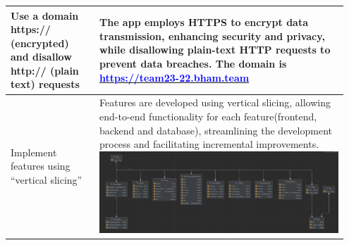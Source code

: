 \documentclass[a4paper]{article}
\begin{document}
{\begin{tabular}{|p{0.25\linewidth}|p{0.70\linewidth}|}
 \hline
 Use a domain https:// (encrypted) and disallow http:// (plain text) requests &  The app employs HTTPS to encrypt data transmission, enhancing security and privacy, while disallowing plain-text HTTP requests to prevent data breaches. The domain is \href{https://team23-22.bham.team}{\textcolor{blue}{https://team23-22.bham.team}}\\
 \hline
 Implement features using “vertical slicing” & Features are developed using vertical slicing, allowing end-to-end functionality for each feature(frontend, backend and database), streamlining the development process and facilitating incremental improvements. \includegraphics[width=10cm]{./image/Vertical_slice.png}\\
 \hline
\end{tabular}}
\end{document}
